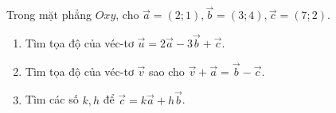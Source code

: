 \begin{bt}%
    Trong mặt phẳng $Oxy$, cho $\overrightarrow{a}=\left(2; 1\right), \overrightarrow{b}=\left(3; 4\right), \overrightarrow{c}=\left(7; 2\right)$.
    \begin{enumerate}
        \item Tìm tọa độ của véc-tơ $\overrightarrow{u}=2\overrightarrow{a} - 3\overrightarrow{b} + \overrightarrow{c}$. 
        \item Tìm tọa độ của véc-tơ $\overrightarrow{v}$ sao cho $\overrightarrow{v} + \overrightarrow{a}=\overrightarrow{b} - \overrightarrow{c}$. 
        \item Tìm các số $k, h$ để $\overrightarrow{c}=k\overrightarrow{a} + h\overrightarrow{b}$. 
    \end{enumerate}
\end{bt}

